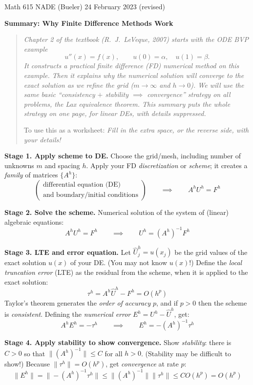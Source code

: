 \documentclass[11pt]{amsart}
\newcommand{\prob}[1]{\bigskip\noindent\textbf{#1.}\quad }
\begin{document}
\scriptsize \noindent Math 615 NADE (Bueler) \hfill 24 February 2023 (revised) \quad {}
\normalsize\medskip

\Large\centerline{\textbf{Summary: Why Finite Difference Methods Work}}
\medskip
\normalsize

\thispagestyle{empty}
\begin{quote}
\emph{Chapter 2 of the textbook (R.~J.~LeVeque, 2007) starts with the ODE BVP example}
	$$u''(x)=f(x), \qquad u(0)=\alpha, \quad u(1) = \beta.$$
\emph{It constructs a practical finite difference (FD) numerical method on this example.  Then it explains why the numerical solution will converge to the exact solution as we refine the grid ($m\to\infty$ and $h\to 0$).  We will use the same basic ``consistency $+$ stability $\implies$ convergence'' strategy on all problems, the \emph{Lax equivalence theorem}.  This summary puts the whole strategy on one page, for linear DEs, with details suppressed.}

\medskip
\noindent To use this as a worksheet: \emph{Fill in the extra space, or the reverse side, with your details!}
\end{quote}

\medskip

\prob{Stage 1.  Apply scheme to DE}  Choose the grid/mesh, including number of unknowns $m$ and spacing $h$.  Apply your FD \emph{discretization} or \emph{scheme}; it creates a \emph{family} of matrices $\{A^h\}$:
   $$\begin{pmatrix} \text{differential equation (DE)} \\ \text{and boundary/initial conditions} \end{pmatrix} \qquad \implies \qquad A^h U^h = F^h$$

\vfill
\prob{Stage 2.  Solve the scheme}  Numerical solution of the system of (linear) algebraic equations:
   $$A^h U^h = F^h \qquad \implies \qquad U^h = (A^h)^{-1} F^h$$

\vfill
\prob{Stage 3.  LTE and error equation}  Let $\hat U^h_j = u(x_j)$ be the grid values of the exact solution $u(x)$ of your DE.  (You may not know $u(x)$!)  Define the \emph{local truncation error} (LTE) as the residual from the scheme, when it is applied to the exact solution:
   $$\tau^h = A^h \hat U^h - F^h = O(h^p)$$
Taylor's theorem generates the \emph{order of accuracy} $p$, and if $p>0$ then the scheme is \emph{consistent}.  Defining the \emph{numerical error} $E^h = U^h - \hat U^h$, get:
   $$A^h E^h = -\tau^h \qquad \implies \qquad E^h = - (A^h)^{-1} \tau^h$$

\vfill
\prob{Stage 4.  Apply stability to show convergence}  Show \emph{stability}: there is $C>0$ so that $\|(A^h)^{-1}\| \le C$ for all $h>0$.  (Stability may be difficult to show!)  Because $\|\tau^h\| = O(h^p)$, get \emph{convergence} at rate $p$:
	$$\|E^h\| = \|- (A^h)^{-1} \tau^h\| \le \|(A^h)^{-1}\| \|\tau^h\| \le C O(h^p) = O(h^p)$$

\vfill
\end{document}
